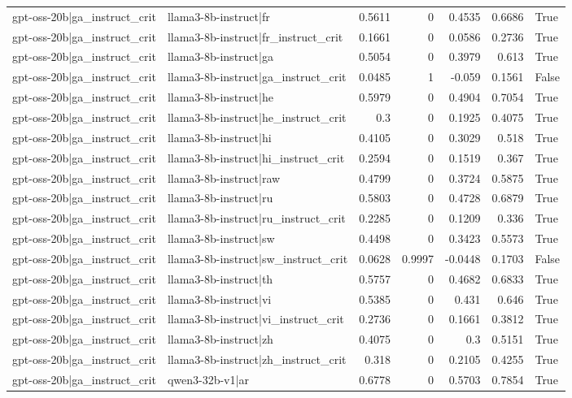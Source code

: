 \begin{table}
\begin{tabular}{l l r r r r l}
gpt-oss-20b|ga_instruct_crit & llama3-8b-instruct|fr & 0.5611 & 0 & 0.4535 & 0.6686 & True \\
gpt-oss-20b|ga_instruct_crit & llama3-8b-instruct|fr_instruct_crit & 0.1661 & 0 & 0.0586 & 0.2736 & True \\
gpt-oss-20b|ga_instruct_crit & llama3-8b-instruct|ga & 0.5054 & 0 & 0.3979 & 0.613 & True \\
gpt-oss-20b|ga_instruct_crit & llama3-8b-instruct|ga_instruct_crit & 0.0485 & 1 & -0.059 & 0.1561 & False \\
gpt-oss-20b|ga_instruct_crit & llama3-8b-instruct|he & 0.5979 & 0 & 0.4904 & 0.7054 & True \\
gpt-oss-20b|ga_instruct_crit & llama3-8b-instruct|he_instruct_crit & 0.3 & 0 & 0.1925 & 0.4075 & True \\
gpt-oss-20b|ga_instruct_crit & llama3-8b-instruct|hi & 0.4105 & 0 & 0.3029 & 0.518 & True \\
gpt-oss-20b|ga_instruct_crit & llama3-8b-instruct|hi_instruct_crit & 0.2594 & 0 & 0.1519 & 0.367 & True \\
gpt-oss-20b|ga_instruct_crit & llama3-8b-instruct|raw & 0.4799 & 0 & 0.3724 & 0.5875 & True \\
gpt-oss-20b|ga_instruct_crit & llama3-8b-instruct|ru & 0.5803 & 0 & 0.4728 & 0.6879 & True \\
gpt-oss-20b|ga_instruct_crit & llama3-8b-instruct|ru_instruct_crit & 0.2285 & 0 & 0.1209 & 0.336 & True \\
gpt-oss-20b|ga_instruct_crit & llama3-8b-instruct|sw & 0.4498 & 0 & 0.3423 & 0.5573 & True \\
gpt-oss-20b|ga_instruct_crit & llama3-8b-instruct|sw_instruct_crit & 0.0628 & 0.9997 & -0.0448 & 0.1703 & False \\
gpt-oss-20b|ga_instruct_crit & llama3-8b-instruct|th & 0.5757 & 0 & 0.4682 & 0.6833 & True \\
gpt-oss-20b|ga_instruct_crit & llama3-8b-instruct|vi & 0.5385 & 0 & 0.431 & 0.646 & True \\
gpt-oss-20b|ga_instruct_crit & llama3-8b-instruct|vi_instruct_crit & 0.2736 & 0 & 0.1661 & 0.3812 & True \\
gpt-oss-20b|ga_instruct_crit & llama3-8b-instruct|zh & 0.4075 & 0 & 0.3 & 0.5151 & True \\
gpt-oss-20b|ga_instruct_crit & llama3-8b-instruct|zh_instruct_crit & 0.318 & 0 & 0.2105 & 0.4255 & True \\
gpt-oss-20b|ga_instruct_crit & qwen3-32b-v1|ar & 0.6778 & 0 & 0.5703 & 0.7854 & True \\

\end{tabular}
\end{table}
